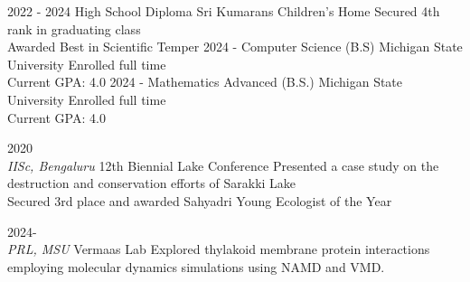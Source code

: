 \documentclass[9pt]{developercv} %
\begin{document}
\vspace{-10 pt}
\begin{entrylist}
    \entry
		{2022 - 2024}
		{High School Diploma}
		{Sri Kumarans Children's Home}
		{Secured 4th rank in graduating class \\ Awarded Best in Scientific Temper}
    \entry
		{2024 - }
		{Computer Science (B.S)}
		{Michigan State University}
		{Enrolled full time \\ 
		Current GPA: 4.0}
	\entry
		{2024 - }
		{Mathematics Advanced (B.S.)}
		{Michigan State University}
		{Enrolled full time \\ 
		Current GPA: 4.0}

\end{entrylist}
\begin{entrylist}
	\entry
		{2020 \\ \vspace{4pt}\color{gray} \textit{IISc, Bengaluru}}
		{12th Biennial Lake Conference}
		{}
		{Presented a case study on the destruction and conservation efforts of Sarakki Lake\\ 
		Secured 3rd place and awarded Sahyadri Young Ecologist of the Year}
\end{entrylist}
\begin{entrylist}
	\entry 
		{2024- \\ \vspace{4pt}\color{gray} \textit{PRL, MSU}}
		{Vermaas Lab}
		{}
		{Explored thylakoid membrane protein interactions employing molecular dynamics simulations using NAMD and VMD.}
\end{entrylist}
\end{document}
